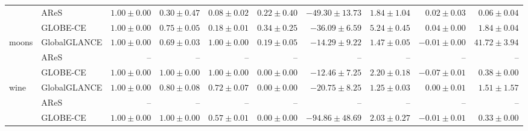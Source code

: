 \begin{table}[ht]
\begin{center}
\begin{sc}
\begin{scriptsize}
\begin{tabular}{l|l|rrrrrrrr}
 & AReS & $\boldsymbol{1.00\pm{0.00}}$ & $0.30\pm{0.47}$ & $0.08\pm{0.02}$ & $0.22\pm{0.40}$ & $-49.30\pm{13.73}$ & $\boldsymbol{1.84\pm{1.04}}$ & $0.02\pm{0.03}$ & $\boldsymbol{0.06\pm{0.04}}$ \\
 & GLOBE-CE & $\boldsymbol{1.00\pm{0.00}}$ & $0.75\pm{0.05}$ & $0.18\pm{0.01}$ & $\boldsymbol{0.34\pm{0.25}}$ & $\boldsymbol{-36.09\pm{6.59}}$ & $5.24\pm{0.45}$ & $\boldsymbol{0.04\pm{0.00}}$ & $1.84\pm{0.04}$ \\
\midrule
\multirow{3}{*}{moons} & GlobalGLANCE & $\boldsymbol{1.00\pm{0.00}}$ & $0.69\pm{0.03}$ & $\boldsymbol{1.00\pm{0.00}}$ & $\boldsymbol{0.19\pm{0.05}}$ & $-14.29\pm{9.22}$ & $\boldsymbol{1.47\pm{0.05}}$ & $\boldsymbol{-0.01\pm{0.00}}$ & $41.72\pm{3.94}$ \\
 & AReS & -- & -- & -- & -- & -- & -- & -- & -- \\
 & GLOBE-CE & $\boldsymbol{1.00\pm{0.00}}$ & $\boldsymbol{1.00\pm{0.00}}$ & $\boldsymbol{1.00\pm{0.00}}$ & $0.00\pm{0.00}$ & $\boldsymbol{-12.46\pm{7.25}}$ & $2.20\pm{0.18}$ & $-0.07\pm{0.01}$ & $\boldsymbol{0.38\pm{0.00}}$ \\
\midrule
\multirow{3}{*}{wine} & GlobalGLANCE & $\boldsymbol{1.00\pm{0.00}}$ & $0.80\pm{0.08}$ & $\boldsymbol{0.72\pm{0.07}}$ & $\boldsymbol{0.00\pm{0.00}}$ & $\boldsymbol{-20.75\pm{8.25}}$ & $\boldsymbol{1.25\pm{0.03}}$ & $\boldsymbol{0.00\pm{0.01}}$ & $1.51\pm{1.57}$ \\
 & AReS & -- & -- & -- & -- & -- & -- & -- & -- \\
 & GLOBE-CE & $\boldsymbol{1.00\pm{0.00}}$ & $\boldsymbol{1.00\pm{0.00}}$ & $0.57\pm{0.01}$ & $\boldsymbol{0.00\pm{0.00}}$ & $-94.86\pm{48.69}$ & $2.03\pm{0.27}$ & $-0.01\pm{0.01}$ & $\boldsymbol{0.33\pm{0.00}}$ \\
\bottomrule
\end{tabular}
\end{scriptsize}
\end{sc}
\end{center}
\end{table}

